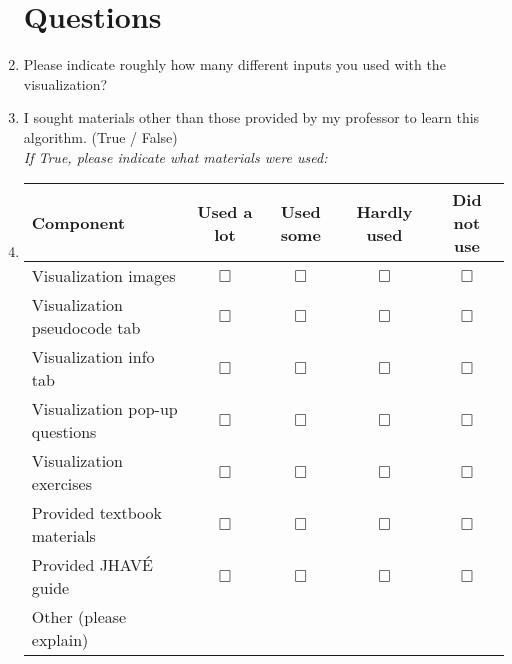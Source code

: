 \documentclass[letter]{article}
\begin{document}
\begin{enumerate}

\section*{Questions}

\item Please indicate roughly how many different inputs you used with the visualization? \underline{\hspace{1cm}}

\item I sought materials other than those provided by my professor to learn this algorithm.
(True / False) \\ \textsl{If True, please indicate what materials were used:}


\item
\begin{tabular}{| l | c | c | c | c |}
\hline
\textbf{Component} & \textbf{Used a lot} & \textbf{Used some} & \textbf{Hardly used} & \textbf{Did not use} \\
\hline
Visualization images & $\Box$ & $\Box$ & $\Box$ & $\Box$ \\
\hline
Visualization pseudocode tab & $\Box$ & $\Box$ & $\Box$ & $\Box$ \\
\hline
Visualization info tab & $\Box$ & $\Box$ & $\Box$ & $\Box$ \\
\hline
Visualization pop-up questions & $\Box$ & $\Box$ & $\Box$ & $\Box$ \\
\hline
Visualization exercises & $\Box$ & $\Box$ & $\Box$ & $\Box$ \\
\hline
Provided textbook materials & $\Box$ & $\Box$ & $\Box$ & $\Box$ \\
\hline
Provided JHAVÉ guide & $\Box$ & $\Box$ & $\Box$ & $\Box$ \\
\hline
Other (please explain) &&&&\\ %
\hline
\end{tabular}

\addtocounter{enumi}{7}


\end{enumerate}
\end{document}
